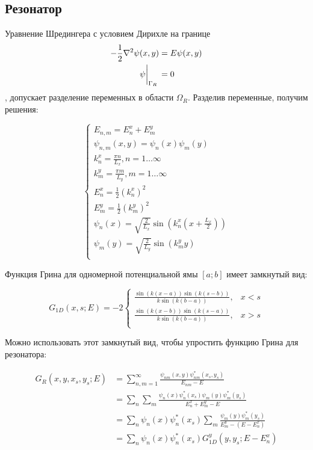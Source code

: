 \subsection{Резонатор}
Уравнение Шредингера с условием Дирихле на границе
\begin{align*}
- \frac{1}{2}\laplacian \psi(x, y) &= E \psi(x, y) \\
\eval{\psi}_{\Gamma_R}{} &= 0
\end{align*}
, допускает разделение переменных в области $\Omega_R$. Разделив переменные, получим решения:

\[
\begin{cases}
E_{n,m} = E_n^x + E_m^y \\
\psi_{n, m}(x, y) = \psi_n(x) \psi_m(y) \\
k_n^x = \frac{\pi n}{L_x}, n = 1 \dots \infty \\
k_m^y = \frac{\pi m}{L_y}, m = 1 \dots \infty \\
E_n^x = \frac{1}{2} (k_n^x)^2 \\
E_m^y = \frac{1}{2} (k_m^y)^2 \\
\psi_n(x) = \sqrt{\frac{2}{L_x}} \sin(k_n^x (x + \frac{L_x}{2}))\\
\psi_m(y) = \sqrt{\frac{2}{L_y}} \sin(k_m^y y) \\
\end{cases}
\]

Функция Грина для одномерной потенциальной ямы $[a; b]$ имеет замкнутый вид:

$$G_{1D}(x, s; E) = - 2 \begin{cases}
\frac{\sin(k(x - a)) \sin(k(s - b))}{k \sin(k(b - a))}, & x < s \\
\frac{\sin(k(x - b)) \sin(k(s - a))}{k \sin(k(b - a))}, & x > s \\
\end{cases}$$

Можно использовать этот замкнутый вид, чтобы упростить функцию Грина для резонатора:

\begin{align*}
G_R(x, y, x_s, y_s; E)
&= \sum\limits_{n, m = 1}^\infty \frac{\psi_{nm}(x, y) \psi^*_{nm}(x_s, y_s)}{E_{nm} - E} \\
&= \sum\limits_n \sum\limits_m \frac{\psi_n(x) \psi_n^*(x_s) \psi_m(y) \psi_m^*(y_s)}{E^x_n + E^y_m - E} \\
&= \sum\limits_n \psi_n(x) \psi_n^*(x_s) \sum\limits_m \frac{\psi_m(y) \psi_m^*(y_s)}{E^y_m - (E - E^x_n)} \\
&= \sum\limits_n \psi_n(x) \psi^*_n(x_s) G^y_{1D}(y, y_s; E - E^x_n)
\end{align*}

